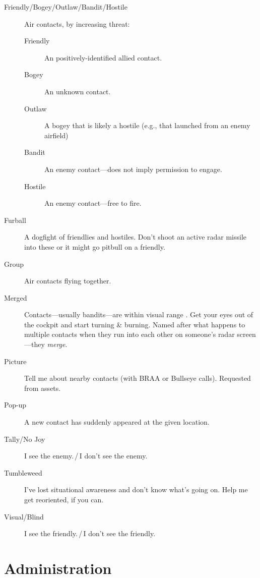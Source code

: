 \begin{description}
\item[Friendly/Bogey/Outlaw/Bandit/Hostile]
    Air contacts, by increasing threat:
    \begin{description}
    \item[Friendly] An positively-identified allied contact.
    \item[Bogey] An unknown contact.
    \item[Outlaw] A bogey that is likely a hostile
        (e.g., that launched from an enemy airfield)
    \item[Bandit] An enemy contact---does not imply permission to engage.
    \item[Hostile] An enemy contact---free to fire.
    \end{description}

\item[Furball] A dogfight of friendlies and hostiles.
    Don't shoot an active radar missile into these or it might go pitbull
    on a friendly.

\item[Group] Air contacts flying together.

\item[Merged] Contacts---usually bandits---are within visual range
    .
    Get your eyes out of the cockpit and start turning \& burning.
    Named after what happens to multiple contacts when they run into each other
    on someone's radar screen---they \emph{merge}.

\item[Picture] Tell me about nearby contacts (with BRAA or Bullseye calls).
    Requested from  assets.

\item[Pop-up] A new contact has suddenly appeared at the given location.

\item[Tally/No Joy] I see the enemy.\,/\,I don't see the enemy.

\item[Tumbleweed] I've lost situational awareness 
    and don't know what's going on.
    Help me get reoriented, if you can.

\item[Visual/Blind] I see the friendly.\,/\,I don't see the friendly.
\end{description}

\section{Administration}

